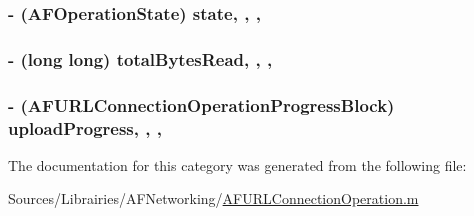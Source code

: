 \hypertarget{category_a_f_u_r_l_connection_operation_07_08_a6a1365f049676a63b618117ebbf066e5}{
\subsubsection[{state}]{\setlength{\rightskip}{0pt plus 5cm}-\/ ({\bf A\-F\-Operation\-State}) state\hspace{0.3cm}{\ttfamily [read]}, {\ttfamily [write]}, {\ttfamily [nonatomic]}, {\ttfamily [assign]}}}\label{category_a_f_u_r_l_connection_operation_07_08_a6a1365f049676a63b618117ebbf066e5}
\hypertarget{category_a_f_u_r_l_connection_operation_07_08_a08a500031a7a4cd7cfa97f041b471a31}{
\subsubsection[{total\-Bytes\-Read}]{\setlength{\rightskip}{0pt plus 5cm}-\/ (long long) total\-Bytes\-Read\hspace{0.3cm}{\ttfamily [read]}, {\ttfamily [write]}, {\ttfamily [nonatomic]}, {\ttfamily [assign]}}}\label{category_a_f_u_r_l_connection_operation_07_08_a08a500031a7a4cd7cfa97f041b471a31}
\hypertarget{category_a_f_u_r_l_connection_operation_07_08_afe3a5f549dbbda0c5706cd6d7da0590d}{
\subsubsection[{upload\-Progress}]{\setlength{\rightskip}{0pt plus 5cm}-\/ ({\bf A\-F\-U\-R\-L\-Connection\-Operation\-Progress\-Block}) upload\-Progress\hspace{0.3cm}{\ttfamily [read]}, {\ttfamily [write]}, {\ttfamily [nonatomic]}, {\ttfamily [copy]}}}\label{category_a_f_u_r_l_connection_operation_07_08_afe3a5f549dbbda0c5706cd6d7da0590d}


The documentation for this category was generated from the following file\-:\begin{DoxyCompactItemize}
\item 
Sources/\-Librairies/\-A\-F\-Networking/\hyperlink{_a_f_u_r_l_connection_operation_8m}{A\-F\-U\-R\-L\-Connection\-Operation.\-m}\end{DoxyCompactItemize}
